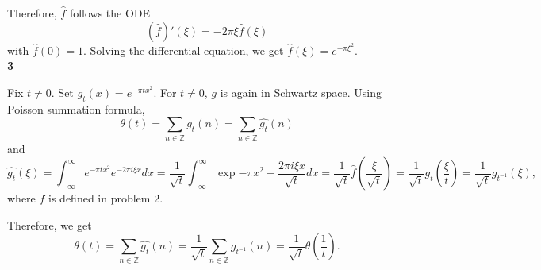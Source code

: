 \documentclass[a4paper, 12pt]{article}
\theoremstyle{Mydefinition}
\theoremstyle{Mytheorem}
\begin{document}
Therefore, $\hat{f}$ follows the ODE
\begin{equation}
    \left(\hat{f}\right)'(\xi) = -2\pi\xi\hat{f}(\xi)
\end{equation}
with $\hat{f}(0) = 1$. Solving the differential equation, we get $\hat{f}(\xi) = e^{-\pi \xi^2}$.\\

\noindent \textbf{3}

Fix $t\neq 0$. Set $g_t(x) = e^{-\pi t x^2}$. For $t\neq 0$, $g$ is again in Schwartz space. Using Poisson summation formula,
\begin{equation}
    \theta(t) = \sum_{n\in \mathbb{Z}} g_t(n) = \sum_{n\in \mathbb{Z}} \hat{g_t}(n)
\end{equation}
and
\begin{equation}
    \hat{g_t}(\xi) = \int_{-\infty}^\infty e^{-\pi t x^2} e^{-2\pi i \xi x}dx = \frac{1}{\sqrt{t}}\int_{-\infty}^\infty \exp{-\pi x^2 -\frac{2\pi i \xi x}{\sqrt{t}}}dx = \frac{1}{\sqrt{t}}\hat{f}\left(\frac{\xi}{\sqrt{t}}\right) = \frac{1}{\sqrt{t}}g_t\left(\frac{\xi}{t}\right) = \frac{1}{\sqrt{t}}g_{t^{-1}}\left(\xi\right),
\end{equation}
where $f$ is defined in problem 2.

Therefore, we get
\begin{equation}
    \theta(t) = \sum_{n\in \mathbb{Z}} \hat{g_t}(n) = \frac{1}{\sqrt{t}}\sum_{n\in \mathbb{Z}} g_{t^{-1}}\left(n\right) = \frac{1}{\sqrt{t}}\theta\left(\frac{1}{t}\right).
\end{equation}
\end{document}
